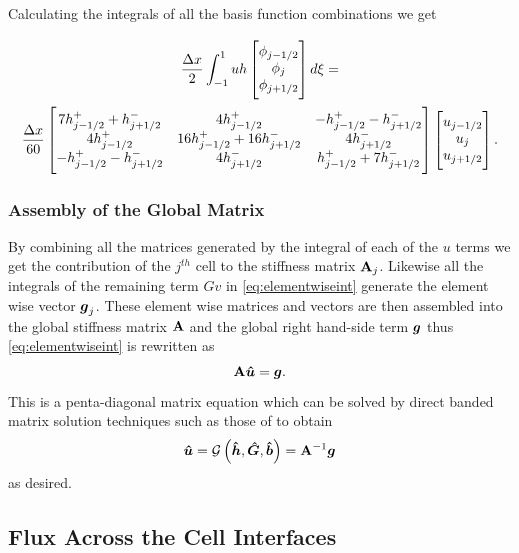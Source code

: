 Calculating the integrals of all the basis function combinations we get

\begin{multline*}
\frac{\Delta x}{2}\int_{-1 }^{1}  uh \begin{bmatrix} \TM
\phi_{j-1/2}\\\phi_j \\\phi_{j+1/2} \BM
\end{bmatrix} d\xi =  \\ \frac{\Delta x}{60}  \begin{bmatrix} \TM
7 h^+_{j-1/2} + h^-_{j+1/2} & 4 h^+_{j-1/2}   & - h^+_{j-1/2} - h^-_{j+1/2}\\ 4 h^+_{j-1/2} & 16 h^+_{j-1/2} + 16 h^-_{j+1/2}& 4 h^-_{j+1/2}\\ - h^+_{j-1/2} - h^-_{j+1/2} &  4 h^-_{j+1/2} &  h^+_{j-1/2} + 7 h^-_{j+1/2} \BM
\end{bmatrix}  \begin{bmatrix} \TM
u_{j-1/2}\\u_j \\u _{j+1/2} \BM
\end{bmatrix}.
\end{multline*}

\subsubsection{Assembly of the Global Matrix}
By combining all the matrices generated by the integral of each of the $u$ terms we get the contribution of the $j^{th}$ cell to the stiffness matrix $\mathbf{A}_j$. Likewise all the integrals of the remaining term $Gv$ in \eqref{eq:elementwiseint} generate the element wise vector $\boldsymbol{g}_{j}$. These element wise matrices and vectors are then assembled into the global stiffness matrix $\mathbf{A}$ and the global right hand-side term $\boldsymbol{g}$ thus \eqref{eq:elementwiseint} is rewritten as
\begin{equation}
\label{eqn:FEMElemMatrixJ}
 \mathbf{A} \boldsymbol{\hat{u}} = \boldsymbol{g}.
\end{equation}
This is a penta-diagonal matrix equation which can be solved by direct banded matrix solution techniques such as those of \citet{NumRecC-1996} to obtain
\begin{equation}
\boldsymbol{\hat{u}} =\mathcal{G}\left( \boldsymbol{\hat{h}}, \boldsymbol{\hat{G}},\boldsymbol{\hat{b}} \right) =   \mathbf{A}^{-1}\boldsymbol{g}
\label{eqn:usolvefromGhb}
\end{equation}
as desired.
\subsection{Flux Across the Cell Interfaces}

